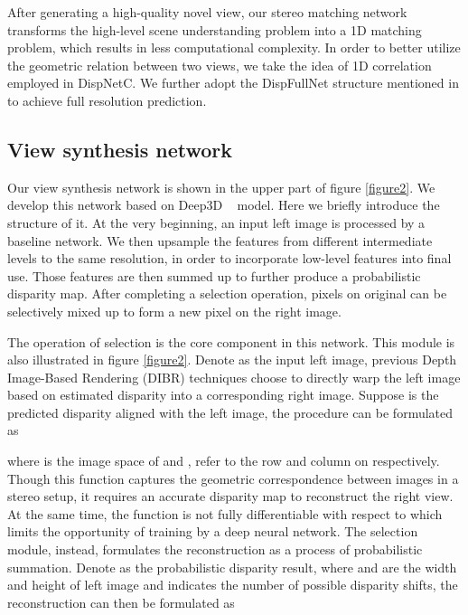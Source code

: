 \documentclass[10pt,twocolumn,letterpaper]{article}
\begin{document}
After generating a high-quality novel view, our stereo matching network transforms the high-level scene understanding problem into a 1D matching problem, which results in less computational complexity. In order to better utilize the geometric relation between two views, we take the idea of 1D correlation employed in DispNetC\cite{mayer2016disp}. We further adopt the DispFullNet structure mentioned in \cite{pang2017cascade} to achieve full resolution prediction. 


\subsection{View synthesis network}
Our view synthesis network is shown in the upper part of figure \ref{figure2}. We develop this network based on Deep3D ~\cite{xie2016deep3d} model. Here we briefly introduce the structure of it. At the very beginning, an input left image  is processed by a baseline network. We then upsample the features from different intermediate levels to the same resolution, in order to incorporate low-level features into final use. Those features are then summed up to further produce a probabilistic disparity map. After completing a selection operation, pixels on original  can be selectively mixed up to form a new pixel on the right image.

The operation of selection is the core component in this network. This module is also illustrated in figure \ref{figure2}. Denote  as the input left image, previous Depth Image-Based Rendering (DIBR) techniques choose to directly warp the left image based on estimated disparity into a corresponding right image. Suppose  is the predicted disparity aligned with the left image, the procedure can be formulated as

\vspace{-8pt}

\vspace{-13pt}

where  is the image space of  and ,  refer to the row and column on  respectively. Though this function captures the geometric correspondence between images in a stereo setup, it requires an accurate disparity map to reconstruct the right view. At the same time, the function is not fully differentiable with respect to  which limits the opportunity of training by a deep neural network. The selection module, instead, formulates the reconstruction as a process of probabilistic summation. Denote  as the probabilistic disparity result, where  and  are the width and height of left image and 
 indicates the number of possible disparity shifts, the reconstruction can then be formulated as
\end{document}
